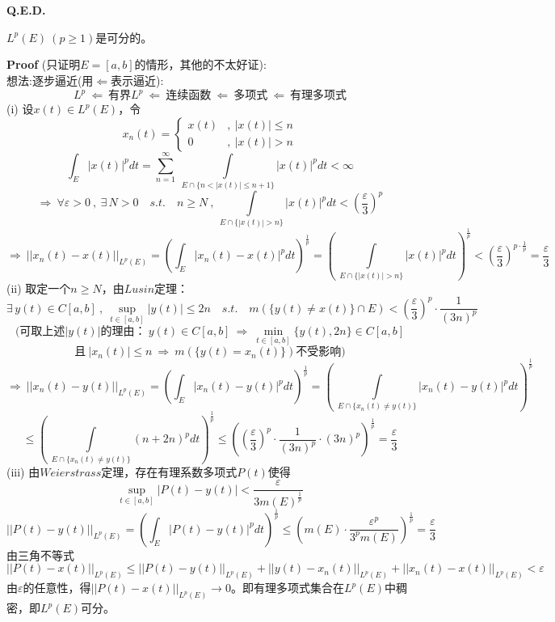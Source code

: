 \textbf{Q.E.D.}
\begin{theorem}
    $L^p(E) \ (p \geq 1)$是可分的。
\end{theorem}
\textbf{Proof} (只证明$E=[a,b]$的情形，其他的不太好证):\\
想法:逐步逼近(用$\Leftarrow$表示逼近):
\[L^p \ \Leftarrow \ \text{有界}L^p \ \Leftarrow \ \text{连续函数} \ \Leftarrow \ \text{多项式} \ \Leftarrow \ \text{有理多项式}\]
(i) 设$x(t) \in L^p(E)$，令
\[x_n(t)=\left \{
\begin{array}{ll}
    x(t) & , \ |x(t)| \leq n \\ 0 & , \ |x(t)|>n
\end{array}
\right.
\]
\[\int_E|x(t)|^pdt=\sum_{n=1}^{\infty} \ \int\limits_{E \cap \{n<|x(t)| \leq n+1\}}|x(t)|^pdt<\infty\]
\[\Rightarrow \ \forall \varepsilon>0 \ , \ \exists \, N>0 \quad s.t. \quad n \geq N \ , \ \int\limits_{E \cap \{|x(t)|>n\}}|x(t)|^pdt<\left(\frac{\varepsilon}{3}\right)^p\]
\[\Rightarrow \ ||x_n(t)-x(t)||_{L^p(E)}=\left(\int_E|x_n(t)-x(t)|^pdt\right)^{\frac{1}{p}}=\left( \ \int\limits_{E \cap \{|x(t)|>n\}}|x(t)|^pdt\right)^{\frac{1}{p}}<\left(\frac{\varepsilon}{3}\right)^{p \cdot \frac{1}{p}}=\frac{\varepsilon}{3}\]
(ii) 取定一个$n \geq N$，由$Lusin$定理：
\[\exists \, y(t) \in C[a,b] \ , \ \mathop \text{sup}\limits_{t \in [a,b]}|y(t)| \leq 2n \quad s.t. \quad m(\{y(t) \neq x(t)\} \cap E)<\left(\frac{\varepsilon}{3}\right)^p \cdot \frac{1}{(3n)^p}\]
\[(\text{可取上述$|y(t)|$的理由：} \ y(t) \in C[a,b] \ \Rightarrow \ \mathop \text{min}\limits_{t \in [a,b]}\{y(t),2n\} \in C[a,b]\]
\[\text{且} \ |x_n(t)| \leq n \ \Rightarrow \ m(\{y(t)=x_n(t)\})\text{不受影响})\]
\[\Rightarrow \ ||x_n(t)-y(t)||_{L^p(E)}=\left(\int_E|x_n(t)-y(t)|^pdt\right)^{\frac{1}{p}}=\left( \ \int\limits_{E \cap \{x_n(t) \neq y(t)\}}|x_n(t)-y(t)|^pdt\right)^{\frac{1}{p}}\]
\[\leq \left( \ \int\limits_{E \cap \{x_n(t) \neq y(t)\}}(n+2n)^pdt\right)^{\frac{1}{p}} \leq \left(\left(\frac{\varepsilon}{3}\right)^p \cdot \frac{1}{(3n)^p} \cdot (3n)^p\right)^{\frac{1}{p}}=\frac{\varepsilon}{3}\]
(iii) 由$Weierstrass$定理，存在有理系数多项式$P(t)$使得
\[\mathop \text{sup}\limits_{t \in [a,b]}|P(t)-y(t)|<\frac{\varepsilon}{3m(E)^{\frac{1}{p}}}\]
\[||P(t)-y(t)||_{L^p(E)}=\left(\int_E|P(t)-y(t)|^pdt\right)^{\frac{1}{p}} \leq \left(m(E) \cdot \frac{\varepsilon^p}{3^pm(E)}\right)^{\frac{1}{p}}=\frac{\varepsilon}{3}\]
由三角不等式
\[||P(t)-x(t)||_{L^p(E)} \leq ||P(t)-y(t)||_{L^p(E)}+||y(t)-x_n(t)||_{L^p(E)}+||x_n(t)-x(t)||_{L^p(E)}<\varepsilon\]
由$\varepsilon$的任意性，得$||P(t)-x(t)||_{L^p(E)} \to 0$。即有理多项式集合在$L^p(E)$中稠密，即$L^p(E)$可分。

